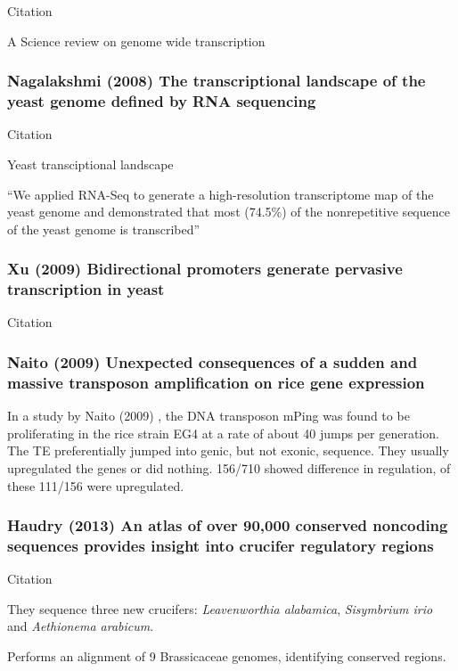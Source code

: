       Citation \cite{kapranov_genome-wide_2007}

      A Science review on genome wide transcription 

    \subsubsection{Nagalakshmi (2008) The transcriptional landscape of the
    yeast genome defined by RNA sequencing}

      Citation \cite{nagalakshmi_transcriptional_2008}

      Yeast transciptional landscape 

      ``We applied RNA-Seq to generate a high-resolution transcriptome
      map of the yeast genome and demonstrated that most (74.5\%) of the
      nonrepetitive sequence of the yeast genome is transcribed''

    \subsubsection{Xu (2009) Bidirectional promoters generate pervasive
    transcription in yeast}
    
      Citation \cite{xu_bidirectional_2009}

    \subsubsection{Naito (2009) Unexpected consequences of a sudden and
    massive transposon amplification on rice gene expression}

      In a study by Naito (2009) \cite{naito_unexpected_2009}, the DNA
      transposon mPing was found to be proliferating in the rice strain EG4
      at a rate of about 40 jumps per generation. The TE preferentially
      jumped into genic, but not exonic, sequence. They usually upregulated
      the genes or did nothing. 156/710 showed difference in regulation, of
      these 111/156 were upregulated. 



      \FloatBarrier

    \subsubsection{Haudry (2013) An atlas of over 90,000 conserved
    noncoding sequences provides insight into crucifer regulatory regions}

      Citation \cite{haudry_atlas_2013}

      They sequence three new crucifers: \textit{Leavenworthia alabamica},
      \textit{Sisymbrium irio} and \textit{Aethionema arabicum}.

      Performs an alignment of 9 Brassicaceae genomes, identifying
      conserved regions.


